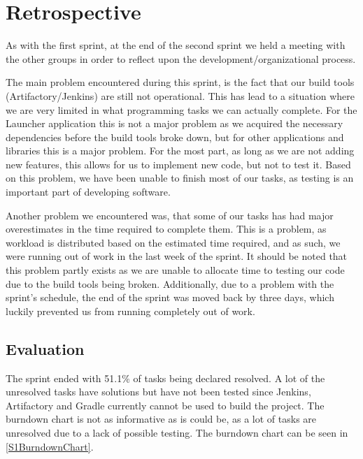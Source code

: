\section{Retrospective}\label{S2Retro}
As with the first sprint, at the end of the second sprint we held a meeting with
the other groups in order to reflect upon the development/organizational
process.\nl

The main problem encountered during this sprint, is the fact that our build
tools (Artifactory/Jenkins) are still not operational. This has lead to a
situation where we are very limited in what programming tasks we can actually
complete. For the Launcher application this is not a major problem as we
acquired the necessary dependencies before the build tools broke down, but for
other applications and libraries this is a major problem. For the most part, as
long as we are not adding new features, this allows for us to implement new
code, but not to test it. Based on this problem, we have been unable to finish
most of our tasks, as testing is an important part of developing software.\nl

Another problem we encountered was, that some of our tasks has had major
overestimates in the time required to complete them. This is a problem, as
workload is distributed based on the estimated time required, and as such, we
were running out of work in the last week of the sprint. It should be noted that
this problem partly exists as we are unable to allocate time to testing our code
due to the build tools being broken. Additionally, due to a problem with the
sprint's schedule, the end of the sprint was moved back by three days, which
luckily prevented us from running completely out of work.

\subsection{Evaluation}
The sprint ended with 51.1\% of tasks being declared resolved. A lot of the
unresolved tasks have solutions but have not been tested since Jenkins,
Artifactory and Gradle currently cannot be used to build the project.
The burndown chart is not as informative as is could
be, as a lot of tasks are unresolved due to a lack of
possible testing. The burndown chart can be seen in \autoref{S1BurndownChart}.






